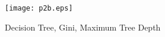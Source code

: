 



























\begin{figure}[h]
  \centering
  \texttt{[image: p2b.eps]}
  \label{p2b}
  \caption{Decision Tree, Gini, Maximum Tree Depth}
\end{figure}
